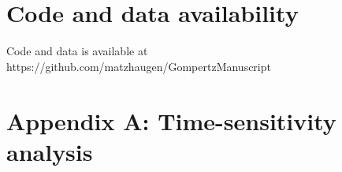 \documentclass{article}
\begin{document}
\appendix
\section*{Code and data availability}
Code and data is available at https://github.com/matzhaugen/GompertzManuscript
\renewcommand{\thesubsection}{\Alph{subsection}}



\section*{Appendix A: Time-sensitivity analysis}
\end{document}
